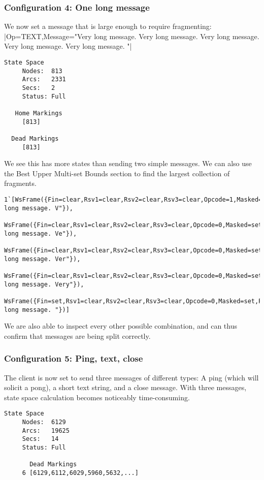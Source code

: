 	\subsubsection{Configuration 4: One long message}
	We now set a message that is large enough to require fragmenting:
	|{Op=TEXT,Message="Very long message. Very long message. Very long message. Very long message. Very long message. "}|
	
	\begin{lstlisting}[language={},float]
  State Space
     Nodes:  813
     Arcs:   2331
     Secs:   2
     Status: Full
     
   Home Markings
     [813]

  Dead Markings
     [813]
	\end{lstlisting}
	We see this has more states than sending two simple messages. We can also use
	the Best Upper Multi-set Bounds section to find the largest collection of
	fragments.
	\begin{lstlisting}[language={},gobble=1,float]
	1`[WsFrame({Fin=clear,Rsv1=clear,Rsv2=clear,Rsv3=clear,Opcode=1,Masked=set,Payload_length=20,Masking_key=Mask([0,0,0,0]),Payload="Very long message. V"}),
	WsFrame({Fin=clear,Rsv1=clear,Rsv2=clear,Rsv3=clear,Opcode=0,Masked=set,Payload_length=20,Masking_key=Mask([0,0,0,0]),Payload="ery long message. Ve"}),
	WsFrame({Fin=clear,Rsv1=clear,Rsv2=clear,Rsv3=clear,Opcode=0,Masked=set,Payload_length=20,Masking_key=Mask([0,0,0,0]),Payload="ry long message. Ver"}),
	WsFrame({Fin=clear,Rsv1=clear,Rsv2=clear,Rsv3=clear,Opcode=0,Masked=set,Payload_length=20,Masking_key=Mask([0,0,0,0]),Payload="y long message. Very"}),
	WsFrame({Fin=set,Rsv1=clear,Rsv2=clear,Rsv3=clear,Opcode=0,Masked=set,Payload_length=15,Masking_key=Mask([0,0,0,0]),Payload=" long message. "})]
	\end{lstlisting}
	We are also able to inspect every other possible combination, and can thus
	confirm that messages are being split correctly.

	\subsubsection{Configuration 5: Ping, text, close}
	The client is now set to send three messages of different types: A ping
	(which will solicit a pong), a short text string, and a	close message. With
	three messages, state space calculation becomes noticeably time-consuming.
	
	\begin{lstlisting}[language={},float]
  State Space
     Nodes:  6129
     Arcs:   19625
     Secs:   14
     Status: Full
     
       Dead Markings
     6 [6129,6112,6029,5960,5632,...]
	\end{lstlisting}
	
